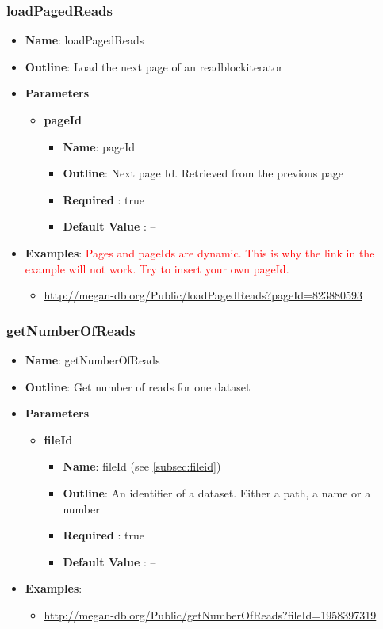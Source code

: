 \documentclass[11pt]{article}
\begin{document}
\subsubsection{loadPagedReads}

\begin{itemize}
	\item \textbf{Name}: loadPagedReads
	\item \textbf{Outline}: Load the next page of an readblockiterator
	\item \textbf{Parameters}
		\begin{itemize}
			\item \textbf{pageId}
				\begin{itemize}
					\item \textbf{Name}: pageId
					\item \textbf{Outline}: Next page Id. Retrieved from the previous page
					\item \textbf{Required} : true
					\item \textbf{Default Value} : --
				\end{itemize}
		\end{itemize}
	\item \textbf{Examples}: \textcolor{red}{Pages and pageIds are dynamic. This is why the link in the example will not work. Try to insert your own pageId.}
		\begin{itemize}
			\item \url{http://megan-db.org/Public/loadPagedReads?pageId=823880593}
		\end{itemize}
\end{itemize}


\subsubsection{getNumberOfReads}

\begin{itemize}
	\item \textbf{Name}: getNumberOfReads
	\item \textbf{Outline}: Get number of reads for one dataset
	\item \textbf{Parameters}
		\begin{itemize}
			\item \textbf{fileId}
				\begin{itemize}
					\item \textbf{Name}: fileId (see \ref{subsec:fileid})
					\item \textbf{Outline}: An identifier of a dataset. Either a path, a name or a number
					\item \textbf{Required} : true
					\item \textbf{Default Value} : --
				\end{itemize}
		\end{itemize}
	\item \textbf{Examples}:
		\begin{itemize}
			\item \url{http://megan-db.org/Public/getNumberOfReads?fileId=1958397319}
		\end{itemize}
\end{itemize}
\end{document}
